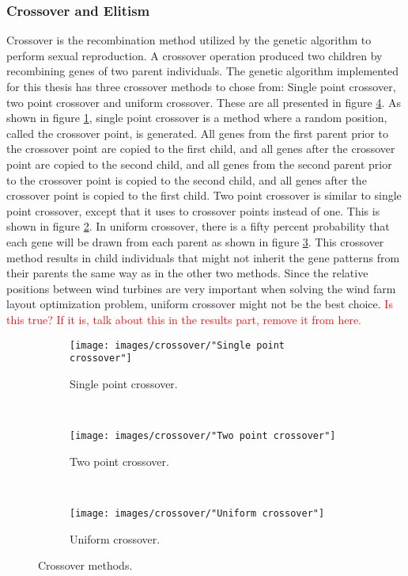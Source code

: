 \subsubsection{Crossover and Elitism}
Crossover is the recombination method utilized by the genetic algorithm to perform sexual reproduction. A crossover operation produced two children by recombining genes of two parent individuals. The genetic algorithm implemented for this thesis has three crossover methods to chose from: Single point crossover, two point crossover and uniform crossover. These are all presented in figure \ref{figure:crossover methods}. As shown in figure \ref{figure:single point crossover}, single point crossover is a method where a random position, called the crossover point, is generated. All genes from the first parent prior to the crossover point are copied to the first child, and all genes after the crossover point are copied to the second child, and all genes from the second parent prior to the crossover point is copied to the second child, and all genes after the crossover point is copied to the first child. Two point crossover is similar to single point crossover, except that it uses to crossover points instead of one. This is shown in figure \ref{figure:two point crossover}. In uniform crossover, there is a fifty percent probability that each gene will be drawn from each parent as shown in figure \ref{figure:uniform crossover}. This crossover method results in child individuals that might not inherit the gene patterns from their parents the same way as in the other two methods. Since the relative positions between wind turbines are very important when solving the wind farm layout optimization problem, uniform crossover might not be the best choice. \textcolor{red}{Is this true? If it is, talk about this in the results part, remove it from here.}


\begin{figure}[h!]
    \centering
    \begin{subfigure}[b]{0.3\textwidth}
        \texttt{[image: images/crossover/"Single point crossover"]}
        \caption{Single point crossover.}
        \label{figure:single point crossover}
    \end{subfigure}
    ~ 
    \begin{subfigure}[b]{0.3\textwidth}
        \texttt{[image: images/crossover/"Two point crossover"]}
        \caption{Two point crossover.}
        \label{figure:two point crossover}
    \end{subfigure}
    ~
    \begin{subfigure}[b]{0.3\textwidth}
        \texttt{[image: images/crossover/"Uniform crossover"]}
        \caption{Uniform crossover.}
        \label{figure:uniform crossover}
    \end{subfigure}
    \caption{Crossover methods.}\label{figure:crossover methods}
\end{figure}


